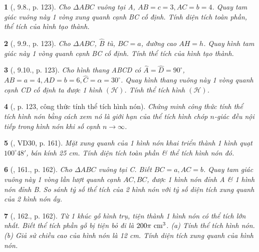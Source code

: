 \documentclass{article}
\newtheorem{baitoan}{}
\begin{document}
\begin{baitoan}[\cite{Binh_boi_duong_Toan_9_tap_2}, 9.8., p. 123]
	Cho $\Delta ABC$ vuông tại A, $AB = c = 3,AC = b = 4$. Quay tam giác vuông này 1 vòng xung quanh cạnh BC cố định. Tính diện tích toàn phần, thể tích của hình tạo thành.
\end{baitoan}

\begin{baitoan}[\cite{Binh_boi_duong_Toan_9_tap_2}, 9.9., p. 123]
	Cho $\Delta ABC$, $\widehat{B}$ tù, $BC = a$, đường cao $AH = h$. Quay hình tam giác này 1 vòng quanh cạnh BC cố định. Tính thể tích của hình tạo thành.
\end{baitoan}

\begin{baitoan}[\cite{Binh_boi_duong_Toan_9_tap_2}, 9.10., p. 123]
	Cho hình thang ABCD có $\widehat{A} = \widehat{D} = 90^\circ$, $AB = a = 4,AD = b = 6,\widehat{C} = \alpha = 30^\circ$. Quay hình thang vuông này 1 vòng quanh cạnh CD cố định ta được 1 hình $(\mathcal{H})$. Tính thể tích hình $(\mathcal{H})$.
\end{baitoan}

\begin{baitoan}[\cite{Binh_boi_duong_Toan_9_tap_2}, p. 123, công thức tính thể tích hình nón]
	Chứng minh công thức tính thể tích hình nón bằng cách xem nó là giới hạn của thể tích hình chóp $n$-giác đều nội tiếp trong hình nón khi số cạnh $n\to\infty$.
\end{baitoan}

\begin{baitoan}[\cite{Tuyen_Toan_9_old}, VD30, p. 161]
	Mặt xung quanh của 1 hình nón khai triển thành 1 hình quạt $100^\circ48'$, bán kính {\rm25 cm}. Tính diện tích toàn phần \& thể tích hình nón đó.
\end{baitoan}

\begin{baitoan}[\cite{Tuyen_Toan_9_old}, 161., p. 162]
	Cho $\Delta ABC$ vuông tại C. Biết $BC = a,AC = b$. Quay tam giác vuông này 1 vòng lần lượt quanh cạnh $AC,BC$, được 1 hình nón đỉnh A \& 1 hình nón đỉnh B. So sánh tỷ số thể tích của 2 hình nón với tỷ số diện tích xung quanh của 2 hình nón ấy.
\end{baitoan}

\begin{baitoan}[\cite{Tuyen_Toan_9_old}, 162., p. 162]
	Từ 1 khúc gỗ hình trụ, tiện thành 1 hình nón có thể tích lớn nhất. Biết thể tích phần gỗ bị tiện bỏ đi là $200\pi\ {\rm cm}^3$. (a) Tính thể tích hình nón. (b) Giả sử chiều cao của hình nón là {\rm12 cm}. Tính diện tích xung quanh của hình nón.
\end{baitoan}
\end{document}
